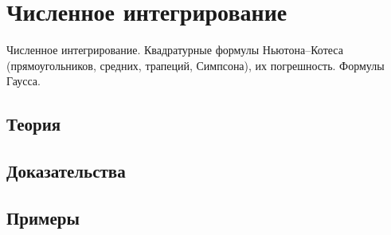 
\section{Численное интегрирование}
\label{sec:2.1.10-numerical-integration}

\begin{ticket}
Численное интегрирование. Квадратурные формулы Ньютона–Котеса (прямоугольников, средних, трапеций, Симпсона), их погрешность. Формулы Гаусса.
\end{ticket}

\subsection*{Теория}

\subsection*{Доказательства}

\subsection*{Примеры}
